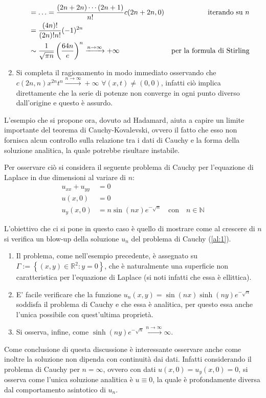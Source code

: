 \begin{example}
\begin{enumerate}
\begin{align*}
 &= \ldots = \frac{(2n+2n)\cdots(2n+1)}{n!}c(2n+2n,0) &\text{\quad iterando su } n\\
 &= \frac{(4n)!}{(2n)!n!} (-1)^{2n} \\
 &\sim \frac{1}{\sqrt{\pi n}}\left(\frac{64n}{e}\right)^n \xrightarrow{n\rightarrow\infty} +\infty  &\text{per la formula di Stirling}
\end{align*}
\item
Si completa il ragionamento in modo immediato osservando che 
$c(2n,n) x^{2n} t ^{n}\xrightarrow{n\rightarrow\infty} +\infty$ $\forall (x,t) \neq (0,0)$, 
infatti ciò implica direttamente che la serie di potenze non converge in ogni punto diverso dall'origine e questo è assurdo.
\end{enumerate}
\end{example}


\begin{example}
L'esempio che si propone ora, dovuto ad Hadamard, aiuta a capire un limite importante del teorema di Cauchy-Kovalevski, 
ovvero il fatto che esso non fornisca alcun controllo sulla relazione tra i dati di Cauchy e la forma della soluzione analitica, 
la quale potrebbe risultare instabile.

Per osservare ciò si considera il seguente problema di Cauchy per l'equazione di Laplace in due dimensioni al variare di $n$:
\begin{align}
\label{al:1}
u_{xx}+u_{yy}&=0\nonumber\\
u(x,0)&=0\\
u_y(x,0)&=n\sin(nx)e^{-\sqrt{n}} \quad \text{con} \quad n\in\mathbb{N}\nonumber
\end{align}

L'obiettivo che ci si pone in questo caso è quello di mostrare come al crescere di $n$ 
si verifica un blow-up della soluzione $u_n$ del problema di Cauchy (\ref{al:1}).
\begin{enumerate}[1.]
\item
Il problema, come nell'esempio precedente, è assegnato su $\Gamma:=\left\lbrace(x,y) \in \mathbb{R}^2:y=0\right\rbrace$, che è naturalmente una superficie non caratteristica per l'equazione di Laplace (si noti infatti che essa è ellittica).
\item
E' facile verificare che la funzione $u_n(x,y)=\sin(nx)\sinh(ny)e^{-\sqrt{n}}$ soddisfa il problema di Cauchy e che essa è analitica, per questo essa anche l'unica possibile con quest'ultima proprietà.
\item
Si osserva, infine, come $\sinh(ny)e^{-\sqrt{n}}\xrightarrow{n\rightarrow\infty} \infty$.
\end{enumerate}
Come conclusione di questa discussione è interessante osservare anche come inoltre la soluzione non dipenda con continuità dai dati. 
Infatti considerando il problema di Cauchy per $n=\infty$, ovvero con dati $u(x,0)=u_y(x,0)=0$, si osserva come l'unica soluzione analitica è $u\equiv0$, la quale è profondamente diversa dal comportamento asintotico di $u_n$.

\end{example}

